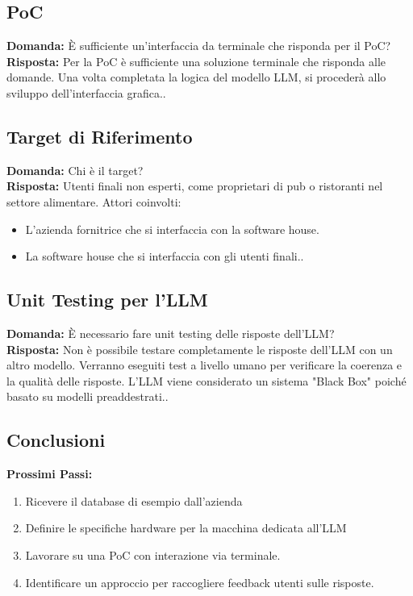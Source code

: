 \documentclass{article}
\begin{document}
    \subsection{PoC}
    \textbf{Domanda:} È sufficiente un'interfaccia da terminale che risponda per il PoC? \\
    \textbf{Risposta:} Per la PoC è sufficiente una soluzione terminale che risponda alle domande. Una volta completata la logica del modello LLM, si procederà allo sviluppo dell’interfaccia grafica..

    \subsection{Target di Riferimento}
    \textbf{Domanda:} Chi è il target? \\
    \textbf{Risposta:} Utenti finali non esperti, come proprietari di pub o ristoranti nel settore alimentare.
    Attori coinvolti:
    \begin{itemize}
        \item L'azienda fornitrice che si interfaccia con la software house.
        \item La software house che si interfaccia con gli utenti finali..
    \end{itemize}

    \subsection{Unit Testing per l'LLM}
    \textbf{Domanda:} È necessario fare unit testing delle risposte dell'LLM? \\
    \textbf{Risposta:} Non è possibile testare completamente le risposte dell'LLM con un altro modello. Verranno eseguiti test a livello umano per verificare la coerenza e la qualità delle risposte. L'LLM viene considerato un sistema "Black Box" poiché basato su modelli preaddestrati..


    \subsection*{Conclusioni}  %
    \textbf{Prossimi Passi:} 
    \begin{enumerate}
        \item Ricevere il database di esempio dall'azienda
        \item Definire le specifiche hardware per la macchina dedicata all'LLM
        \item Lavorare su una PoC con interazione via terminale.
        \item Identificare un approccio per raccogliere feedback utenti sulle risposte.
    \end{enumerate}
\end{document}
